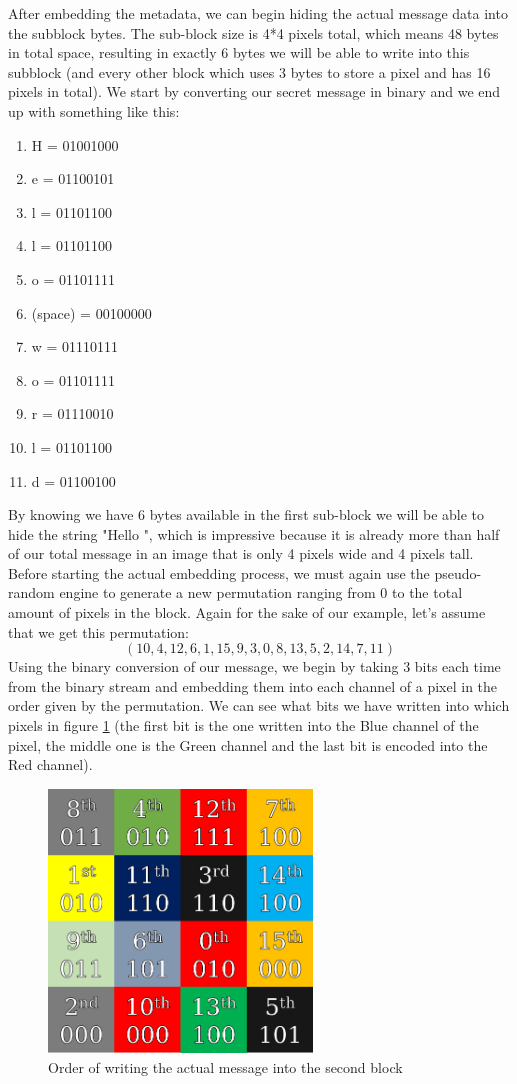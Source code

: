 After embedding the metadata, we can begin hiding the actual message data into the subblock bytes. The sub-block size is 4*4 pixels total, which means 48 bytes in total space, resulting in exactly 6 bytes we will be able to write into this subblock (and every other block which uses 3 bytes to store a pixel and has 16 pixels in total). We start by converting our secret message in binary and we end up with something like this:
\begin{enumerate}
\item H = 01001000
\item e = 01100101
\item l = 01101100
\item l = 01101100
\item o = 01101111
\item (space) = 00100000 
\item w = 01110111 
\item o = 01101111 
\item r = 01110010 
\item l = 01101100 
\item d = 01100100
\end{enumerate}
By knowing we have 6 bytes available in the first sub-block we will be able to hide the string "Hello ", which is impressive because it is already more than half of our total message in an image that is only 4 pixels wide and 4 pixels tall. Before starting the actual embedding process, we must again use the pseudo-random engine to generate a new permutation ranging from 0 to the total amount of pixels in the block. Again for the sake of our example, let's assume that we get this permutation:
\[(10,4,12,6,1,15,9,3,0,8,13,5,2,14,7,11)\]
Using the binary conversion of our message, we begin by taking 3 bits each time from the binary stream and embedding them into each channel of a pixel in the order given by the permutation. We can see what bits we have written into which pixels in figure \ref{scramble_example_second_block} (the first bit is the one written into the Blue channel of the pixel, the middle one is the Green channel and the last bit is encoded into the Red channel).

\begin{figure}[H]
    \centering
    \includegraphics[width=7cm,keepaspectratio]{pics/bmp_scrambling/second_block_marked}
    \caption{Order of writing the actual message into the second block}
    \label{scramble_example_second_block}
\end{figure}

